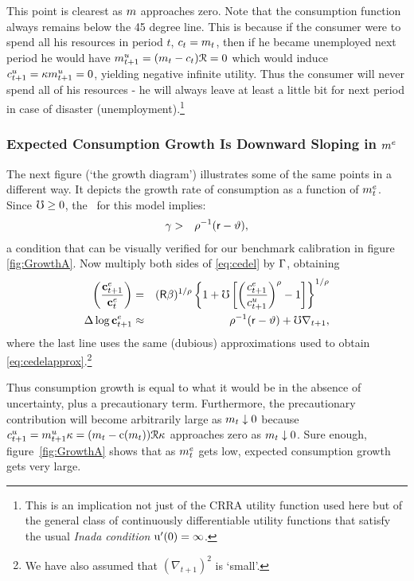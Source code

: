 \documentclass{handout}
\begin{document}
This point is clearest as $m$ approaches zero.  Note that the
consumption function always remains below the 45 degree line.  This
is because if the consumer were to spend all his resources in
period $t$, $c_{t}=m_{t}$, then if he became unemployed next
period he would have ${m}^{u}_{t+1}=(m_{t}-c_{t})\mathcal{R}=0$ which
would induce $c^{u}_{t+1}= \kappa {m}^{u}_{t+1}=0$, yielding negative
infinite utility.  Thus the consumer will never spend all of his
resources - he will always leave at least a little bit for next period
in case of disaster (unemployment).\footnote{This is an implication not just
of the CRRA utility function used here but of the general class of continuously differentiable utility
functions that satisfy the usual {\it Inada condition} ${\mathrm{u}}^{\prime}(0) = \infty$.}

\subsubsection{Expected Consumption Growth Is Downward Sloping in $m^{e}$}
The next figure (`the growth diagram') illustrates some of the same points in a different
way.  It depicts the growth rate of consumption as a function of $m^{e}_{t}$.
Since $\mho \geq 0$, the \GICPGro~for this model
implies:
\begin{eqnarray}
  \gamma & > & \rho^{-1}(\mathsf{r}-\vartheta) ,
\end{eqnarray}
a condition that can be visually verified for our benchmark calibration in figure \ref{fig:GrowthA}.  Now multiply both sides of \eqref{eq:cedel} by $\Gamma$, obtaining
\begin{eqnarray}
        \left(\frac{\mathbf{c}^{e}_{t+1}}{\mathbf{c}^{e}_{t}}\right) & = & (\mathsf{R}\beta)^{1/\rho} \left\{1+\mho\left[\left(\frac{c^{e}_{t+1}}{c^{u}_{t+1}}\right)^{\rho}-1\right]\right\}^{1/\rho} \label{eq:cLevGro}
\\       \Delta \log \mathbf{c}^{e}_{t+1} & \approx & \rho^{-1}(\mathsf{r}-\vartheta) +  \mho \nabla _{t+1}, \label{eq:cLevGroLogUtil}
\end{eqnarray}
where the last line uses the same (dubious) approximations used to obtain
\eqref{eq:cedelapprox}.\footnote{We have also assumed that $(\nabla _{t+1})^{2}$ is `small'.}

Thus consumption growth is equal to what it would be in the absence of
uncertainty, plus a precautionary term.  Furthermore, 
the precautionary contribution will become arbitrarily large as $m_{t}
\downarrow 0$ because $c^{u}_{t+1} = {m}^{u}_{t+1}\kappa  =
(m_{t}-\mathrm{c}(m_{t}))\mathcal{R}\kappa$ approaches zero as $m_{t} \downarrow 0$.  Sure
enough, figure~\ref{fig:GrowthA} shows that as $m^{e}_{t}$
gets low, expected consumption growth gets very large.
\end{document}
